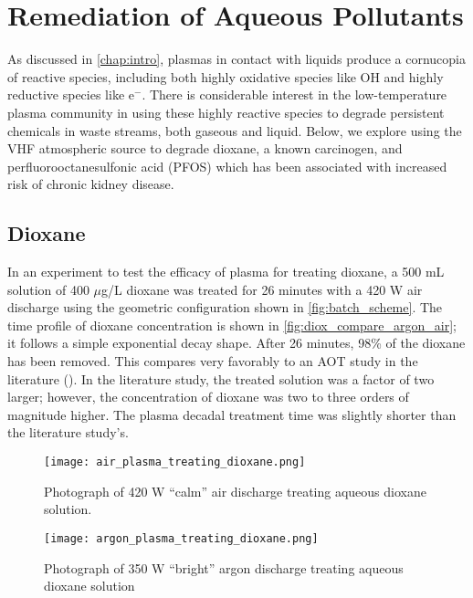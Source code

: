 \section{Remediation of Aqueous Pollutants}
\label{sec:pollutant}

As discussed in \cref{chap:intro}, plasmas in contact with liquids produce a cornucopia of reactive species, including both highly oxidative species like OH and highly reductive species like e$^-$. There is considerable interest in the low-temperature plasma community in using these highly reactive species to degrade persistent chemicals in waste streams, both gaseous and liquid. Below, we explore using the VHF atmospheric source to degrade dioxane, a known carcinogen, and perfluorooctanesulfonic acid (PFOS) which has been associated with increased risk of chronic kidney disease. \cite{shankar2011perfluoroalkyl}

\subsection{Dioxane}
\label{sec:dioxane}

In an experiment to test the efficacy of plasma for treating dioxane, a 500 mL solution of 400 $\mu$g/L dioxane was treated for 26 minutes with a 420 W air discharge using the geometric configuration shown in \cref{fig:batch_scheme}. The time profile of dioxane concentration is shown in \cref{fig:diox_compare_argon_air}; it follows a simple exponential decay shape. After 26 minutes, 98\% of the dioxane has been removed. This compares very favorably to an AOT study in the literature (\cite{suh2004study}). In the literature study, the treated solution was a factor of two larger; however, the concentration of dioxane was two to three orders of magnitude higher. The plasma decadal treatment time was slightly shorter than the literature study's.

\begin{figure}[htbp]
  \centering
  \texttt{[image: air\_plasma\_treating\_dioxane.png]}
  \caption{Photograph of 420 W ``calm'' air discharge treating aqueous dioxane solution.}
  \label{fig:diox_air}
\end{figure}

\begin{figure}[htbp]
  \centering
  \texttt{[image: argon\_plasma\_treating\_dioxane.png]}
  \caption{Photograph of 350 W ``bright'' argon discharge treating aqueous dioxane solution}
  \label{fig:diox_argon}
\end{figure}

